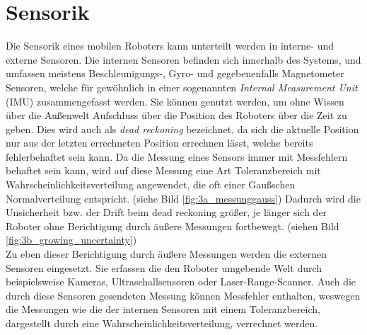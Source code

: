 \section{Sensorik}\label{sec:Sensorik}
Die Sensorik eines mobilen Roboters kann unterteilt werden in interne- und externe Sensoren. Die internen Sensoren befinden sich innerhalb des Systems, und umfassen meistens Beschleunigungs-, Gyro- und gegebenenfalls Magnetometer Sensoren, welche für gewöhnlich in einer sogenannten \textit{Internal Measurement Unit} (IMU) zusammengefasst werden. Sie können genutzt werden, um ohne Wissen über die Außenwelt Aufschluss über die Position des Roboters über die Zeit zu geben. Dies wird auch als \textit{dead reckoning} bezeichnet, da sich die aktuelle Position nur aus der letzten errechneten Position errechnen lässt, welche bereits fehlerbehaftet sein kann. Da die Messung eines Sensors immer mit Messfehlern behaftet sein kann, wird auf diese Messung eine Art Toleranzbereich mit Wahrscheinlichkeitsverteilung angewendet, die oft einer Gaußschen Normalverteilung entspricht. (siehe Bild \ref{fig:3a_messunggauss}) Dadurch wird die Unsicherheit bzw. der Drift beim dead reckoning größer, je länger sich der Roboter ohne Berichtigung durch äußere Messungen fortbewegt. (siehen Bild \ref{fig:3b_growing_uncertainty})\\
Zu eben dieser Berichtigung durch äußere Messungen werden die externen Sensoren eingesetzt. Sie erfassen die den Roboter umgebende Welt durch beispielsweise Kameras, Ultraschallsensoren oder Laser-Range-Scanner. Auch die durch diese Sensoren gesendeten Messung können Messfehler enthalten, weswegen die Messungen wie die der internen Sensoren mit einem Toleranzbereich, dargestellt durch eine Wahrscheinlichkeitsverteilung, verrechnet werden.
\mbox{} %
